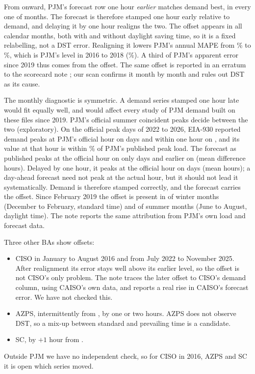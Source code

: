\documentclass[conference,a4paper]{IEEEtran}
\begin{document}
From  onward, PJM's forecast row one hour \emph{earlier} matches demand best, in every one of  months. The forecast is therefore stamped one hour early relative to demand, and delaying it by one hour realigns the two. The offset appears in all calendar months, both with and without daylight saving time, so it is a fixed relabelling, not a DST error. Realigning it lowers PJM's annual MAPE from \% to \%, which is PJM's level in 2016 to 2018 (\%). A third of PJM's apparent error since 2019 thus comes from the offset. The same offset is reported in an erratum to the scorecard note \cite{guerrafilho2026scorecard}; our scan confirms it month by month and rules out DST as its cause.

The monthly diagnostic is symmetric. A demand series stamped one hour late would fit equally well, and would affect every study of PJM demand built on these files since 2019. PJM's official summer coincident peaks \cite{pjm5cp} decide between the two (exploratory). On the  official peak days of 2022 to 2026, EIA-930 reported demand peaks at PJM's official hour on  days and within one hour on , and its value at that hour is within \% of PJM's published peak load. The forecast as published peaks at the official hour on only  days and earlier on  (mean difference  hours). Delayed by one hour, it peaks at the official hour on  days (mean  hours); a day-ahead forecast need not peak at the actual hour, but it should not lead it systematically. Demand is therefore stamped correctly, and the forecast carries the offset. Since February 2019 the offset is present in  of  winter months (December to February, standard time) and  of  summer months (June to August, daylight time). The note \cite{guerrafilho2026scorecard} reports the same attribution from PJM's own load and forecast data.

Three other BAs show offsets:
\begin{itemize}
\item CISO in January to August 2016 and from July 2022 to November 2025. After realignment its error stays well above its earlier level, so the offset is not CISO's only problem. The note \cite{guerrafilho2026scorecard} traces the later offset to CISO's demand column, using CAISO's own data, and reports a real rise in CAISO's forecast error. We have not checked this.
\item AZPS, intermittently from , by one or two hours. AZPS does not observe DST, so a mix-up between standard and prevailing time is a candidate.
\item SC, by $+1$ hour from .
\end{itemize}
Outside PJM we have no independent check, so for CISO in 2016, AZPS and SC it is open which series moved.
\end{document}
